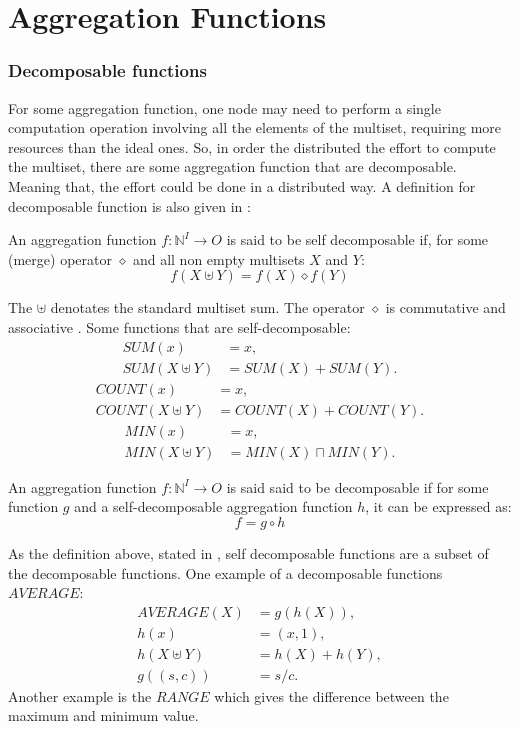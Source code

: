 \chapter{Aggregation Functions}
\subsection {Decomposable functions}
For some aggregation function, one node may need to perform a single computation operation involving all the elements of the multiset, requiring more resources than the ideal ones. So, in order the distributed the effort to compute the multiset, there are some aggregation function that are decomposable. Meaning that, the effort could be done in a distributed way. A definition for decomposable function is also given in \cite{journals/corr/abs-1110-0725}:
\begin{definition} An aggregation function $ f : \mathbb{N}^I \to O$ is said to be self decomposable if, for some (merge) operator $\diamond$ and all non empty multisets $X$ and $Y$:
\begin{equation*}f(X \uplus Y) = f(X) \diamond f(Y) \end{equation*}
\end{definition}
The $\uplus$ denotates the standard multiset sum. The operator $\diamond$ is commutative and associative \cite{journals/corr/abs-1110-0725}. Some functions that are self-decomposable:
\begin{align*}SUM ({x}) &= x,\\
SUM(X \uplus Y) &= SUM(X)+SUM(Y).\end{align*}
\begin{align*}COUNT ({x}) &= x,  \\
COUNT(X \uplus Y)& = COUNT(X)+COUNT(Y).\end{align*}
\begin{align*}MIN ({x}) &= x,\\
MIN(X \uplus Y) &= MIN(X) \sqcap MIN(Y).\end{align*}
\begin{definition}
An aggregation function $ f : \mathbb{N}^I \to O$ is said said to be decomposable if for some function $g$ and a self-decomposable aggregation function $h$, it can be expressed as:
\begin{equation*}f=g \circ h\end{equation*}
\end{definition}
As the definition above, stated in \cite{journals/corr/abs-1110-0725}, self decomposable functions are a subset of the decomposable functions. One example of a decomposable functions $AVERAGE$:
\begin{align*} 
AVERAGE(X) &= g(h(X)),\\
h({x}) &= (x,1),\\
h(X \uplus Y) &= h(X) + h(Y),\\
g((s,c)) &= s/c. \end{align*}
Another example is the $RANGE$ which gives the difference between the maximum and minimum value.


